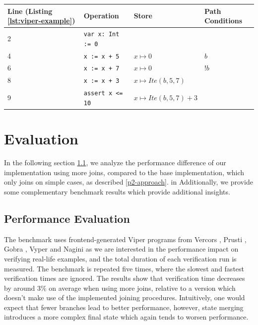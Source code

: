 \documentclass[11pt]{article}
\begin{document}
    \begin{center}
        \begin{tabular}{ l|l|l|l }
            Line (Listing \ref{lst:viper-example}) & Operation & Store & Path Conditions \\
            \hline
            2 & \texttt{var x: Int := 0} & & \\
            4 & \texttt{x := x + 5} & $x \mapsto 0$ & $b$ \\
            6 & \texttt{x := x + 7} & $x \mapsto 0$ & $!b$ \\
            8 & \texttt{x := x + 3} & $x \mapsto Ite(b, 5, 7)$ & \\
            9 & \texttt{assert x <= 10} & $x \mapsto Ite(b, 5, 7) + 3$ & \\
        \end{tabular}
        \label{execution-2}
    \end{center}

    \newpage
    \section{Evaluation}

    In the following section \ref{performance-evaluation}, we analyze the performance difference
    of our implementation using more joins, compared to the base implementation,
    which only joins on simple cases, as described \ref{p2-approach}. in Additionally, we provide some complementary benchmark results
    which provide additional insights. 


    \subsection{Performance Evaluation} \label{performance-evaluation}
    
    The benchmark uses frontend-generated Viper programs from Vercors \cite{vercors},
    Prusti \cite{prusti}, Gobra \cite{gobra}, Vyper \cite{vyper} and Nagini \cite{nagini}
    as we are interested in the performance impact on verifying real-life examples, and
    the total duration of each verification run is measured.
    The benchmark is repeated five times, where the
    slowest and fastest verification times are ignored.
    The results show that verification time
    decreases by around 3\% on average when using more joins,
    relative to a version which doesn't
    make use of the implemented joining procedures.
    Intuitively, one would expect that fewer branches lead to better
    performance, however, state merging introduces a more complex final state which again tends to worsen
    performance.
    
\end{document}
